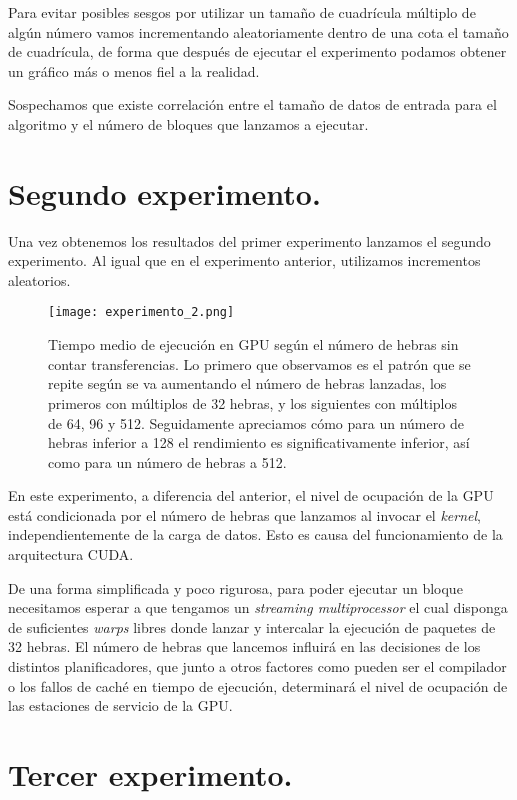 Para evitar posibles sesgos por utilizar un tamaño de cuadrícula múltiplo de algún número vamos incrementando
aleatoriamente dentro de una cota el tamaño de cuadrícula, de forma que después de ejecutar el experimento
podamos obtener un gráfico más o menos fiel a la realidad.

Sospechamos que existe correlación entre el tamaño
de datos de entrada para el algoritmo y el número de bloques que lanzamos a ejecutar.

\section{Segundo experimento.}

Una vez obtenemos los resultados del primer experimento lanzamos el segundo experimento. Al
igual que en el experimento anterior, utilizamos incrementos aleatorios.

\begin{figure}[H]
    \centering
    \texttt{[image: experimento\_2.png]}
    \caption{Tiempo medio de ejecución en GPU según el número de hebras sin contar transferencias.
    Lo primero que observamos es el patrón que se repite según se va aumentando el número de hebras lanzadas,
    los primeros con múltiplos de 32 hebras, y los siguientes con múltiplos de 64, 96 y 512. Seguidamente
    apreciamos cómo para un número de hebras inferior a 128 el rendimiento es significativamente inferior, así
    como para un número de hebras a 512.}
\end{figure}

En este experimento, a diferencia del anterior, el nivel de ocupación de la GPU está condicionada por el número
de hebras que lanzamos al invocar el \textit{kernel}, independientemente de la carga de datos. Esto es causa del
funcionamiento de la arquitectura CUDA.

De una forma simplificada y poco rigurosa, para poder ejecutar un bloque
necesitamos esperar a que tengamos un \textit{streaming multiprocessor} el cual disponga de suficientes
\textit{warps} libres donde lanzar y intercalar la ejecución de paquetes de 32 hebras. El número de hebras
que lancemos influirá en las decisiones de los distintos planificadores, que junto a otros factores como pueden ser el compilador
o los fallos de caché en tiempo de ejecución, determinará el nivel de ocupación de las estaciones de servicio de la
GPU.

\section{Tercer experimento.}

